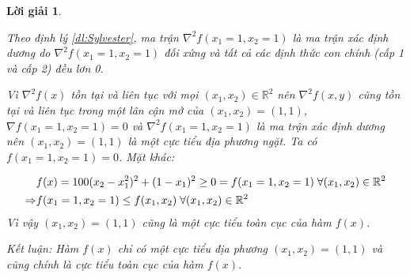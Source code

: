 \documentclass[14pt, a4paper]{article}
\theoremstyle{sltheorem}
\theoremstyle{soltheorem}
\newtheorem*{loigiai}{Lời giải}
\begin{document}
\begin{loigiai}
\begin{enumerate} [wide, labelwidth=!, labelindent=0pt,label=\textbf{\arabic*}.]
            Theo định lý \ref{dl:Sylvester}, ma trận $\nabla^2 f(x_1=1, x_2=1)$ là ma trận xác định dương do $\nabla^2 f(x_1=1, x_2=1)$ đối xứng và tất cả các định thức con chính (cấp 1 và cấp 2) đều lơn 0.

            Vì $\nabla^2 f(x)$ tồn tại và liên tục với mọi $(x_1, x_2) \in \mathbb{R}^{2}$ nên $\nabla^2 f(x, y)$ cũng tồn tại và liên tục trong một lân cận mở của $(x_1, x_2)=(1,1)$, $\nabla f(x_1=1, x_2=1)=0$ và $\nabla^2 f(x_1=1, x_2=1)$ là ma trận xác định dương nên $(x_1, x_2)=(1, 1)$ là một cực tiểu địa phương ngặt. Ta có $f(x_1=1, x_2=1)=0$. Mặt khác:

            \begin{equation*}
                \begin{aligned}
                    &f(x)=100(x_2 - x_1^2)^2 + (1-x_1)^2 \geq 0 = f(x_1=1,x_2=1) \thickspace \forall (x_1, x_2) \in \mathbb{R}^{2} \\
                    \Rightarrow&f(x_1=1,x_2=1) \leq f(x_1, x_2) \thickspace \forall (x_1, x_2) \in \mathbb{R}^{2}
                \end{aligned}
            \end{equation*}
            Vì vậy $(x_1, x_2)=(1, 1)$ cũng là một cực tiểu toàn cục của hàm $f(x)$.

            Kết luận: Hàm $f(x)$ chỉ có một cực tiểu địa phương $(x_1, x_2)=(1,1)$ và cũng chính là cực tiểu toàn cục của hàm $f(x)$.
        \end{enumerate}
    \end{loigiai}

    \newpage
    \printbibliography[title={TÀI LIỆU THAM KHẢO}]
\end{document}
